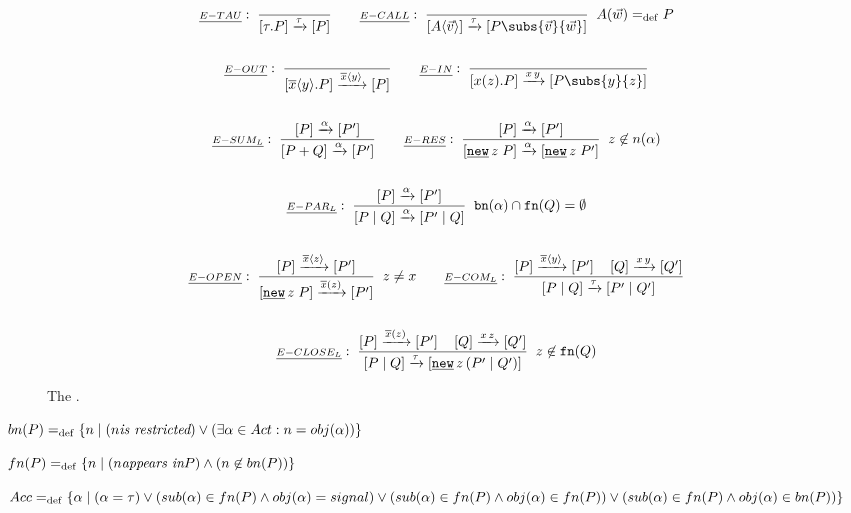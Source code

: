 \begin{figure}[h!]
\begin{gather*}
\kalRule{E-TAU}{}{}{\ec{\tau.P} \transs{\tau} \ec{P}} \quad\quad \kalRule[\procdef{A}{\parl{w}}\define P]{E-CALL}{}{}{\ec{\proccall{A}{\parl{v}}} \tautrans \ec{P\subs{\parl{v}}{\parl{w}}}} \\\\
\kalRule{E-OUT}{}{}{\ec{\out{x}{y}.P} \transs{\out{x}{y}} \ec{P}} \quad\quad \kalRule{E-IN}{}{}{\ec{\inp{x}{z}.P} \intrans{x}{y} \ec{P\subs{y}{z}}} \\\\
\kalRule{E-SUM_L}{}{\ec{P} \transs{\alpha} \ec{P'}}{\ec{P+Q} \transs{\alpha} \ec{P'}} \quad\quad \kalRule[z\nin n(\alpha)]{E-RES}{}{\ec{P} \transs{\alpha} \ec{P'}}{\ec{\procres{z}{P}} \transs{\alpha} \ec{\procres{z}{P'}}} \\\\
\kalRule[\bn{\alpha}\cap\fn{Q}=\emptyset]{E-PAR_L}{}{\ec{P} \transs{\alpha} \ec{P'}}{\ec{\procpar{P}{Q}} \transs{\alpha} \ec{\procpar{P'}{Q}}} \\\\
\kalRule[z\neq x]{E-OPEN}{}{\ec{P} \outtrans{x}{z} \ec{P'}}{\ec{\procres{z}{P}} \bouttrans{x}{z} \ec{P'}} \quad\quad \kalRule{E-COM_L}{\ec{P} \outtrans{x}{y} \ec{P'}}{\ec{Q} \intrans{x}{y} \ec{Q'}}{\ec{\procpar{P}{Q}} \tautrans \ec{\procpar{P'}{Q'}}}\\\\
\kalRule[z\nin\fn{Q}]{E-CLOSE_L}{\ec{P} \bouttrans{x}{z} \ec{P'}}{\ec{Q} \intrans{x}{z} \ec{Q'}}{\ec{\procpar{P}{Q}} \tautrans \ec{\procres[a]{z}{\procpar{P'}{Q'}}}}
\end{gather*}
\caption{The  \cite{sangiorgi}.}
\label{fig_ts_early}
\end{figure}


$bn(P) =_{\mathrm{def}} \{n \mid (n \textit{is restricted}) \vee (\exists \alpha \in Act: n = obj(\alpha))\}$

$fn(P) =_{\mathrm{def}} \{n \mid (n \textit{appears in} P) \wedge (n \not\in bn(P))\}$

$Acc =_{\mathrm{def}} \{\alpha \mid (\alpha = \tau) \vee (sub(\alpha) \in fn(P) \wedge obj(\alpha)=signal) \vee (sub(\alpha) \in fn(P) \wedge obj(\alpha) \in fn(P)) \vee (sub(\alpha) \in fn(P) \wedge obj(\alpha) \in bn(P))\}$

